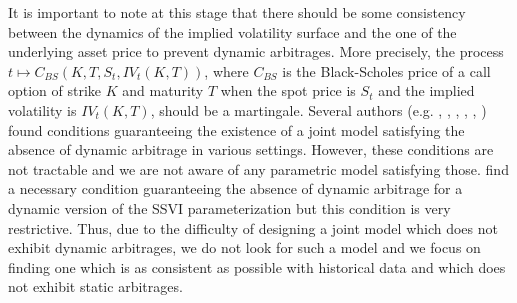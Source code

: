 \begin{remark}
    It is important to note at this stage that there should be some consistency between the dynamics of the implied volatility surface and the one of the underlying asset price to prevent dynamic arbitrages. More precisely, the process $t\mapsto C_{BS}(K,T,S_t,IV_t(K,T))$, where $C_{BS}$ is the Black-Scholes price of a call option of strike $K$ and maturity $T$ when the spot price is $S_t$ and the implied volatility is $IV_t(K,T)$, should be a martingale. Several authors (e.g. \citeauthor{schonbucher1999marketmodel}, \citeyear{schonbucher1999marketmodel}, \citeauthor{schweizer2008term}, \citeyear{schweizer2008term}, \citeauthor{jacod2010risk}, \citeyear{jacod2010risk}) found conditions guaranteeing the existence of a joint model satisfying the absence of dynamic arbitrage in various settings. However, these conditions are not tractable and we are not aware of any parametric model satisfying those. \cite{amrani2021dynamics} find a necessary condition guaranteeing the absence of dynamic arbitrage for a dynamic version of the SSVI parameterization but this condition is very restrictive. Thus, due to the difficulty of designing a joint model which does not exhibit dynamic arbitrages, we do not look for such a model and we focus on finding one which is as consistent as possible with historical data and which does not exhibit static arbitrages. 
\end{remark}


